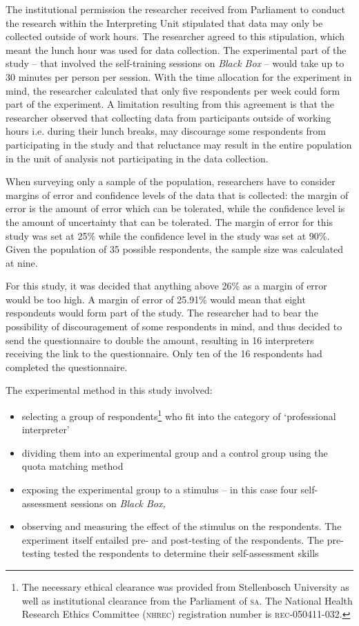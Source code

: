 \documentclass[output=paper]{langsci/langscibook}
\begin{document}
The institutional permission the researcher received from Parliament to conduct the research within the Interpreting Unit stipulated that data may only be collected outside of work hours. The researcher agreed to this stipulation, which meant the lunch hour was used for data collection. The experimental part of the study -- that involved the self-training sessions on \textit{Black Box} -- would take up to 30 minutes per person per session. With the time allocation for the experiment in mind, the researcher calculated that only five respondents per week could form part of the experiment. A limitation resulting from this agreement is that the researcher observed that collecting data from participants outside of working hours i.e. during their lunch breaks, may discourage some respondents from participating in the study and that reluctance may result in the entire population in the unit of analysis not participating in the data collection. 

When surveying only a sample of the population, researchers have to consider margins of error and confidence levels of the data that is collected: the margin of error is the amount of error which can be tolerated, while the confidence level is the amount of uncertainty that can be tolerated. The margin of error for this study was set at 25\% while the confidence level in the study was set at 90\%. Given the population of 35 possible respondents, the sample size was calculated at nine. 

For this study, it was decided that anything above 26\% as a margin of error would be too high. A margin of error of 25.91\% would mean that eight respondents would form part of the study. The researcher had to bear the possibility of discouragement of some respondents in mind, and thus decided to send the questionnaire to double the amount, resulting in 16 interpreters receiving the link to the questionnaire. Only ten of the 16 respondents had completed the questionnaire.

The experimental method in this study involved:

\begin{itemize}
\item selecting a group of respondents\footnote{The necessary ethical clearance was provided from Stellenbosch University as well as institutional clearance from the Parliament of \textsc{sa}. The National Health Research Ethics Committee (\textsc{nhrec}) registration number is \textsc{rec-050411-032}.} who fit into the category of ‘professional interpreter’
\item dividing them into an experimental group and a control group using the quota matching method
\item exposing the experimental group to a stimulus – in this case four self-assessment sessions on \textit{Black Box,}
\item observing and measuring the effect of the stimulus on the respondents. The experiment itself entailed pre- and post-testing of the respondents. The pre-testing tested the respondents to determine their self-assessment skills
\end{itemize}
\end{document}
